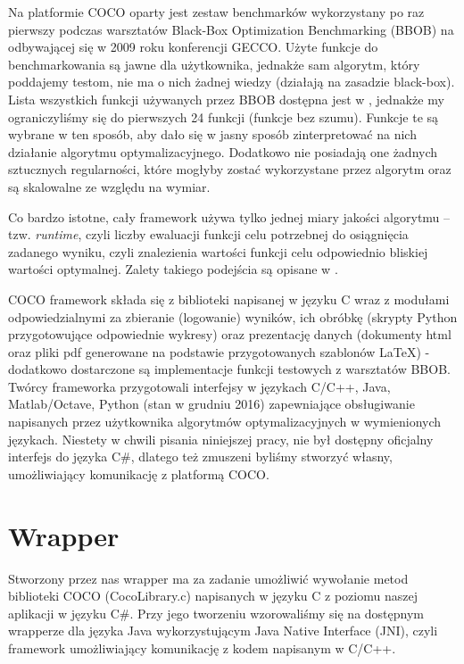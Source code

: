 \documentclass[12pt, twoside, openany, abstract=on]{report}
\theoremstyle{definition}
\begin{document}

Na platformie COCO oparty jest zestaw benchmarków wykorzystany po raz pierwszy podczas warsztatów Black-Box Optimization Benchmarking (BBOB) na odbywającej się w 2009 roku konferencji GECCO.
Użyte funkcje do benchmarkowania są jawne dla użytkownika, jednakże sam algorytm, który poddajemy testom, nie ma o nich żadnej wiedzy (działają na zasadzie black-box). Lista wszystkich funkcji używanych przez BBOB dostępna jest w \cite{Coco}, jednakże my ograniczyliśmy się do pierwszych 24 funkcji (funkcje bez szumu).
Funkcje te są wybrane w ten sposób, aby dało się w jasny sposób zinterpretować na nich działanie algorytmu optymalizacyjnego. Dodatkowo nie posiadają one żadnych sztucznych regularności, które mogłyby zostać wykorzystane przez algorytm oraz są skalowalne ze względu na wymiar.

Co bardzo istotne, cały framework używa tylko jednej miary jakości algorytmu – tzw. \textit{runtime}, czyli liczby ewaluacji funkcji celu potrzebnej do osiągnięcia zadanego wyniku, czyli znalezienia wartości funkcji celu odpowiednio bliskiej wartości optymalnej. Zalety takiego podejścia są opisane w \cite{CocoPlatform}.

COCO framework składa się z biblioteki napisanej w języku C wraz z modułami odpowiedzialnymi za zbieranie (logowanie) wyników, ich obróbkę (skrypty Python przygotowujące odpowiednie wykresy) oraz prezentację danych (dokumenty html oraz pliki pdf generowane na podstawie przygotowanych szablonów LaTeX) - dodatkowo dostarczone są implementacje funkcji testowych z warsztatów BBOB. Twórcy frameworka przygotowali interfejsy w językach C/C++, Java, Matlab/Octave, Python (stan w grudniu 2016) zapewniające obsługiwanie napisanych przez użytkownika algorytmów optymalizacyjnych w wymienionych językach. Niestety w chwili pisania niniejszej pracy, nie był dostępny oficjalny interfejs do języka C\#, dlatego też zmuszeni byliśmy stworzyć własny, umożliwiający komunikację z platformą COCO.

\section{Wrapper}

Stworzony przez nas wrapper ma za zadanie umożliwić wywołanie metod biblioteki COCO (CocoLibrary.c) napisanych w języku C z poziomu naszej aplikacji w języku C\#. Przy jego tworzeniu wzorowaliśmy się na dostępnym wrapperze dla języka Java wykorzystującym Java Native Interface (JNI), czyli framework umożliwiający komunikację z kodem napisanym w C/C++. 
\end{document}
